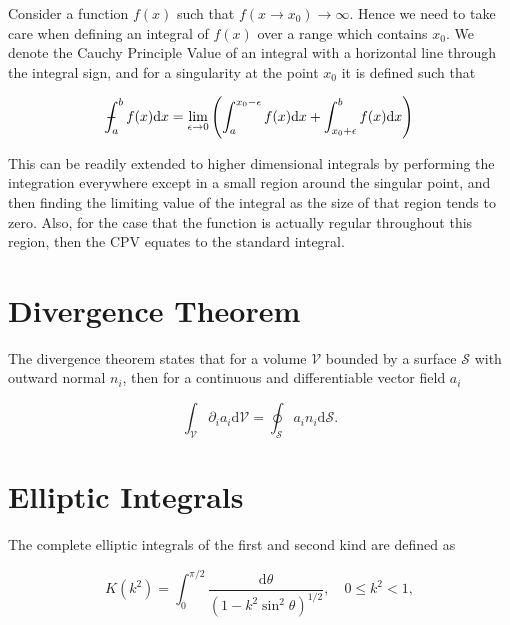 \documentclass[12pt]{article}
\def\Xint#1{\mathchoice
{\XXint\displaystyle\textstyle{#1}}%
{\XXint\textstyle\scriptstyle{#1}}%
{\XXint\scriptstyle\scriptscriptstyle{#1}}%
{\XXint\scriptscriptstyle\scriptscriptstyle{#1}}%
\!\int}
\def\XXint#1#2#3{{\setbox0=\hbox{$#1{#2#3}{\int}$}
\vcenter{\hbox{$#2#3$}}\kern-.5\wd0}}
\def\dashint{\Xint-}
\begin{document}
Consider a function $f(x)$ such that $f(x \to x_{0}) \to \infty$. Hence we need to take care when defining an integral of $f(x)$ over a range which contains $x_{0}$. We denote the Cauchy Principle Value of an integral with a horizontal line through the integral sign, and for a singularity at the point $x_{0}$ it is defined such that \citep{Boas83}

\begin{equation}
\label{equ:CPV}
\dashint_{a}^{b} f(x) \mathrm{d}x = \lim_{\epsilon \to 0} \left( \int_{a}^{x_{0} - \epsilon} f(x) \mathrm{d}x + \int_{x_{0} + \epsilon}^{b} f(x) \mathrm{d}x \right)
\end{equation}

This can be readily extended to higher dimensional integrals by performing the integration everywhere except in a small region around the singular point, and then finding the limiting value of the integral as the size of that region tends to zero. Also, for the case that the function is actually regular throughout this region, then the CPV equates to the standard integral.


\section{Divergence Theorem}
\label{app:div_theory}

The divergence theorem states that for a volume $\mathcal{V}$ bounded by a surface $\mathcal{S}$ with outward normal $n_{i}$, then for a continuous and differentiable vector field $a_{i}$ \citep{Riley06}

\begin{equation}
\label{equ:div_theory}
\int_{\mathcal{V}} \partial_{i} a_{i} \mathrm{d} \mathcal{V} = \oint_{\mathcal{S}} a_{i} n_{i} \mathrm{d} \mathcal{S}.
\end{equation}

\section{Elliptic Integrals}
\label{app:ellip}

The complete elliptic integrals of the first and second kind are defined as \citep{Abramowitz72}

\begin{equation}
\label{equ:ellip1}
K(k^{2}) = \int_{0}^{\pi/2} \frac{\mathrm{d}\theta}{(1 - k^{2} \sin^{2}\theta)^{1/2}}, \quad 0 \leq k^{2} < 1,
\end{equation}
\end{document}

